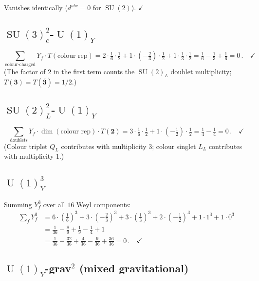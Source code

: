 \documentclass[12pt,a4paper]{article}
\theoremstyle{definition}
\newcommand{\SU}{\operatorname{SU}}
\newcommand{\U}{\operatorname{U}}
\begin{document}
Vanishes identically ($d^{abc} = 0$ for $\SU(2)$). $\checkmark$

\subsection{$\SU(3)_c^2$-$\U(1)_Y$}

\begin{equation}
\sum_{\text{colour-charged}} Y_f \cdot T(\text{colour rep}) = 2 \cdot \tfrac{1}{6} \cdot \tfrac{1}{2} + 1 \cdot (-\tfrac{2}{3}) \cdot \tfrac{1}{2} + 1 \cdot \tfrac{1}{3} \cdot \tfrac{1}{2} = \tfrac{1}{6} - \tfrac{1}{3} + \tfrac{1}{6} = 0\,. \quad\checkmark
\end{equation}
(The factor of $2$ in the first term counts the $\SU(2)_L$ doublet multiplicity; $T(\mathbf{3}) = T(\bar{\mathbf{3}}) = 1/2$.)

\subsection{$\SU(2)_L^2$-$\U(1)_Y$}

\begin{equation}
\sum_{\text{doublets}} Y_f \cdot \dim(\text{colour rep}) \cdot T(\mathbf{2}) = 3 \cdot \tfrac{1}{6} \cdot \tfrac{1}{2} + 1 \cdot (-\tfrac{1}{2}) \cdot \tfrac{1}{2} = \tfrac{1}{4} - \tfrac{1}{4} = 0\,. \quad\checkmark
\end{equation}
(Colour triplet $Q_L$ contributes with multiplicity $3$; colour singlet $L_L$ contributes with multiplicity $1$.)

\subsection{$\U(1)_Y^3$}

Summing $Y_f^3$ over all $16$ Weyl components:
\begin{align}
\sum_f Y_f^3 &= 6 \!\cdot\! \left(\tfrac{1}{6}\right)^{\!3} + 3 \!\cdot\! \left(-\tfrac{2}{3}\right)^{\!3} + 3 \!\cdot\! \left(\tfrac{1}{3}\right)^{\!3} + 2 \!\cdot\! \left(-\tfrac{1}{2}\right)^{\!3} + 1 \!\cdot\! 1^3 + 1 \!\cdot\! 0^3 \nonumber \\
&= \tfrac{1}{36} - \tfrac{8}{9} + \tfrac{1}{9} - \tfrac{1}{4} + 1 \nonumber \\
&= \tfrac{1}{36} - \tfrac{32}{36} + \tfrac{4}{36} - \tfrac{9}{36} + \tfrac{36}{36} = 0\,. \quad\checkmark
\end{align}

\subsection{$\U(1)_Y$-grav$^2$ (mixed gravitational)}
\end{document}
